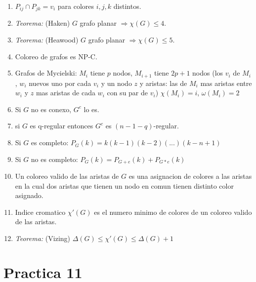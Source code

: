 \documentclass[a4paper, 11pt]{article}
\begin{document}
\begin{enumerate}
\item $P_{ij} \cap P_{jk} = {v_{i}}$ para colores $i,j,k$ distintos.
\item \textit{Teorema:} (Haken) $G$ grafo planar $\Rightarrow \chi(G) \leq 4$. 
\item \textit{Teorema:} (Heawood) $G$ grafo planar $\Rightarrow \chi(G) \leq 5$. 
\item Coloreo de grafos es NP-C.
\item Grafos de Mycielski: $M_{i}$ tiene $p$ nodos, $M_{i+1}$ tiene $2p+1$ nodos (los $v_{i}$ de $M_{i}$, $w_{i}$ nuevos uno por cada $v_{i}$ y un nodo $z$ y aristas: las de $M_{i}$ mas aristas entre $w_{i}$ y $z$ mas aristas de cada $w_{i}$ con su par de $v_{i}$) $\chi(M_{i})=i$, $\omega(M_{i})=2$
\item Si $G$ no es conexo, $G^{c}$ lo es.
\item si $G$ es q-regular entonces $G^{c}$ es $(n-1-q)$-regular.
\item Si $G$ es completo: $P_{G}(k)= k(k-1)(k-2)(...)(k-n+1)$
\item Si $G$ no es completo: $P_{G}(k)= P_{G+e}(k) + P_{G*e}(k)$
\item Un coloreo valido de las aristas de $G$ es una asignacion de colores a las aristas en la cual dos aristas que tienen un nodo en comun tienen distinto color asignado.
\item Indice cromatico $\chi'(G)$ es el numero minimo de colores de un coloreo valido de las aristas.
\item \textit{Teorema:} (Vizing) $\Delta(G) \leq \chi'(G) \leq \Delta(G)+1$
\end{enumerate}
\newpage

\section{Practica 11}
\end{document}
